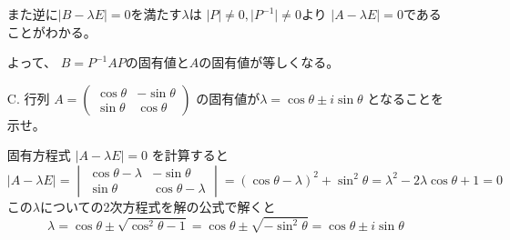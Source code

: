 \documentclass[10pt,b5paper]{ltjsarticle}
\begin{document}
\begin{enumerate}
            また逆に$\lvert B - \lambda E\rvert =0$を満たす$\lambda$は
            $\lvert P\rvert \ne 0, \lvert P^{-1}\rvert \ne 0$より
            $\lvert A - \lambda E\rvert =0$であることがわかる。

            よって、
            $B=P^{-1}AP$の固有値と$A$の固有値が等しくなる。

            \hrulefill
 \item[C. ] 行列
            $A=\begin{pmatrix}
                \cos\theta & -\sin\theta\\ \sin\theta & \cos\theta
               \end{pmatrix}$
            の固有値が$\lambda = \cos\theta \pm i\sin\theta$
            となることを示せ。

            \dotfill

            固有方程式
            $\lvert A - \lambda E\rvert =0$
            を計算すると
            \begin{equation}
             \lvert A - \lambda E\rvert
              =\begin{vmatrix}
                \cos\theta -\lambda & -\sin\theta\\
                \sin\theta & \cos\theta -\lambda
               \end{vmatrix}
               =(\cos\theta -\lambda)^2+\sin^2\theta
               =\lambda^2 -2\lambda\cos\theta +1 =0
            \end{equation}
            この$\lambda$についての2次方程式を解の公式で解くと
            \begin{equation}
             \lambda = \cos\theta \pm \sqrt{\cos^2\theta -1}
              =\cos\theta \pm \sqrt{-\sin^2\theta}
              =\cos\theta \pm i\sin\theta
            \end{equation}
\end{enumerate}
\end{document}
